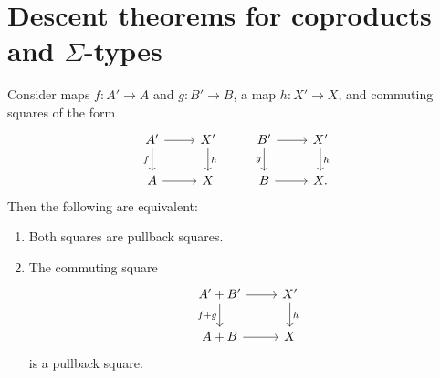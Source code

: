 \section{Descent theorems for coproducts and \texorpdfstring{$\Sigma$}{Σ}-types}

\begin{thm}\label{thm:descent-coprod}
Consider maps $f:A'\to A$ and $g:B'\to B$, a map $h:X'\to X$, and commuting squares of the form
\begin{equation*}
\begin{tikzcd}
A' \arrow[r] \arrow[d,swap,"f"] & X' \arrow[d,"h"] & B' \arrow[r] \arrow[d,swap,"g"] & X' \arrow[d,"h"] \\
A \arrow[r] & X & B \arrow[r] & X.
\end{tikzcd}
\end{equation*}
Then the following are equivalent:
\begin{enumerate}
\item Both squares are pullback squares.
\item The commuting square 
\begin{equation*}
\begin{tikzcd}
A'+B' \arrow[d,swap,"f+g"] \arrow[r] & X' \arrow[d,"h"] \\
A+B \arrow[r] & X
\end{tikzcd}
\end{equation*}
is a pullback square.
\end{enumerate}
\end{thm}

